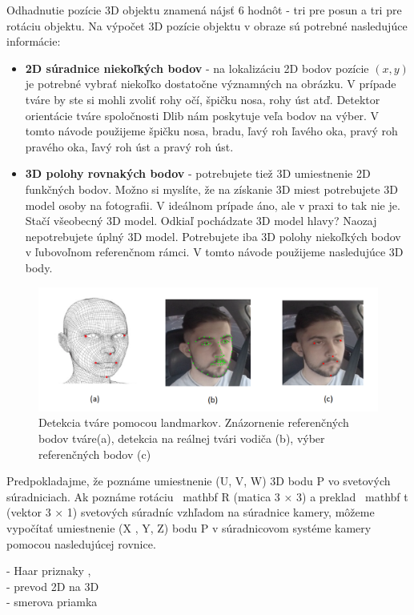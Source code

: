 \documentclass[slovak,master,dept460,male,cpp,cpdeclaration]{diploma}
\begin{document}
Odhadnutie pozície 3D objektu znamená nájsť 6 hodnôt  - tri pre posun a tri pre rotáciu objektu. Na výpočet 3D pozície objektu v obraze sú potrebné nasledujúce informácie:
\begin{itemize}
\item\textbf{2D súradnice niekoľkých bodov} - na lokalizáciu 2D bodov pozície  $(x, y )$ je potrebné vybrať niekoľko dostatočne významných na obrázku. V prípade tváre by ste si mohli zvoliť rohy očí, špičku nosa, rohy úst atď. Detektor orientácie tváre spoločnosti Dlib nám poskytuje veľa bodov na výber. V tomto návode použijeme špičku nosa, bradu, ľavý roh ľavého oka, pravý roh pravého oka, ľavý roh úst a pravý roh úst.
\item\textbf{3D polohy rovnakých bodov}  - potrebujete tiež 3D umiestnenie 2D funkčných bodov. Možno si myslíte, že na získanie 3D miest potrebujete 3D model osoby na fotografii. V ideálnom prípade áno, ale v praxi to tak nie je. Stačí všeobecný 3D model. Odkiaľ pochádzate 3D model hlavy? Naozaj nepotrebujete úplný 3D model. Potrebujete iba 3D polohy niekoľkých bodov v ľubovoľnom referenčnom rámci. V tomto návode použijeme nasledujúce 3D body.
\end{itemize}

\begin{figure}[H]
	\centering
	\includegraphics[width=1\textwidth]{Figures/landmarkPoints.png}
	\caption{Detekcia tváre pomocou landmarkov. Znázornenie referenčných bodov tváre(a), detekcia na reálnej tvári vodiča (b), výber referenčných bodov (c)}
	\label{fig:landmarkPoints}
\end{figure}

Predpokladajme, že poznáme umiestnenie (U, V, W) 3D bodu P vo svetových súradniciach. Ak poznáme rotáciu \ mathbf {R} (matica 3 × 3) a preklad \ mathbf {t} (vektor 3 × 1) svetových súradníc vzhľadom na súradnice kamery, môžeme vypočítať umiestnenie (X , Y, Z) bodu P v súradnicovom systéme kamery pomocou nasledujúcej rovnice.

- Haar  priznaky ,\\
- prevod 2D na 3D \\
- smerova priamka
\end{document}
